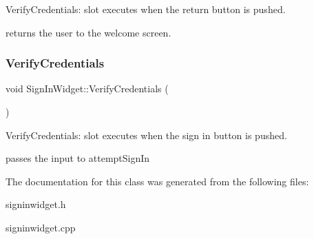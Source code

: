 Verify\+Credentials\+: slot executes when the return button is pushed. 

returns the user to the welcome screen. \mbox{\label{classSignInWidget_a49decc48a2de009aa97b5a3358a76da7}} 
\subsubsection{\texorpdfstring{Verify\+Credentials}{VerifyCredentials}}
{\footnotesize\ttfamily void Sign\+In\+Widget\+::\+Verify\+Credentials (\begin{DoxyParamCaption}{ }\end{DoxyParamCaption})\hspace{0.3cm}{\ttfamily [slot]}}



Verify\+Credentials\+: slot executes when the sign in button is pushed. 

passes the input to attempt\+Sign\+In 

The documentation for this class was generated from the following files\+:\begin{DoxyCompactItemize}
\item 
signinwidget.\+h\item 
signinwidget.\+cpp\end{DoxyCompactItemize}
